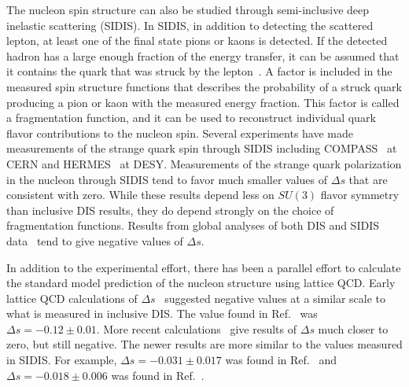   The nucleon spin structure can also be studied through semi-inclusive deep
  inelastic scattering (SIDIS). In SIDIS, in addition to detecting the
  scattered lepton, at least one of the final state pions or kaons is detected.
  If the detected hadron has a large enough fraction of the energy transfer, it
  can be assumed that it contains the quark that was struck by the
  lepton~\cite{Bass:2007zzb}.  A factor is included in the measured spin
  structure functions that describes the probability of a struck quark
  producing a pion or kaon with the measured energy fraction. This factor is
  called a fragmentation function, and it can be used to reconstruct individual
  quark flavor contributions to the nucleon spin. Several experiments have made
  measurements of the strange quark spin through SIDIS including
  COMPASS~\cite{Alekseev:2009ac,Alekseev:2010ub} at CERN and
  HERMES~\cite{Airapetian:2003ct,Airapetian:2004zf,Airapetian:2008qf} at DESY.
  Measurements of the strange quark polarization in the nucleon through SIDIS
  tend to favor much smaller values of $\Delta s$ that are consistent with
  zero. While these results depend less on $SU(3)$ flavor symmetry than
  inclusive DIS results, they do depend strongly on the choice of fragmentation
  functions. Results from global analyses of both DIS and SIDIS
  data~\cite{deFlorian:2008mr,deFlorian:2009vb,Blumlein:2010rn,Nocera:2014gqa,Leader:2014uua}
  tend to give negative values of $\Delta s$.
  
  In addition to the experimental effort, there has been a parallel effort to
  calculate the standard model prediction of the nucleon structure using
  lattice QCD. Early lattice QCD calculations of $\Delta
  s$~\cite{Savage:1996zd,Dong:1995rx} suggested negative values at a similar
  scale to what is measured in inclusive DIS. The value found
  in Ref.~\cite{Dong:1995rx} was $\Delta s = -0.12 \pm 0.01$. More recent
  calculations~\cite{QCDSF:2011aa,Engelhardt:2012gd,Abdel-Rehim:2015lha,Chambers:2015bka}
  give results of $\Delta s$ much closer to zero, but still negative. The newer
  results are more similar to the values measured in SIDIS. For example,
  $\Delta s = -0.031 \pm 0.017$ was found in Ref.~\cite{Engelhardt:2012gd} and
  $\Delta s = - 0.018 \pm 0.006$ was found in Ref.~\cite{Chambers:2015bka}.



